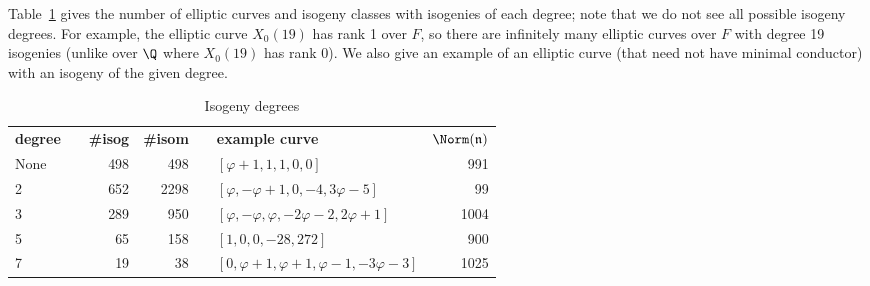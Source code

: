 \documentclass{amsart}
\newcommand{\n}{\mathfrak{n}}
\begin{document}
Table~\ref{table:degree} gives the number of elliptic curves and isogeny classes with
isogenies of each degree; note that we do not see all possible isogeny
degrees. For example, the elliptic curve $X_0(19)$ has rank 1 over $F$, so
there are infinitely many elliptic curves over $F$ with degree 19 isogenies
(unlike over $\Q$ where $X_0(19)$ has rank $0$).
We also give an example of an elliptic curve (that need not have minimal conductor)
with an isogeny of the given degree.
\begin{center}
\begin{table}[h]
\caption{Isogeny degrees\label{table:degree}}
\begin{tabular}{@{}lcrrclr@{}}\toprule
\textbf{degree} & \phantom{a} & \textbf{\#isog} & \textbf{\#isom} & \phantom{a} & \textbf{example curve} & $\Norm(\n)$ \\\cmidrule{1-1}\cmidrule{3-4}\cmidrule{6-7}
None & & 498 & 498  & & $[\varphi+1,1,1,0,0]$                               & 991  \\
2    & & 652 & 2298 & & $[\varphi,-\varphi+1,0,-4,3\varphi-5]$              & 99   \\
3    & & 289 & 950  & & $[\varphi,-\varphi,\varphi,-2\varphi-2,2\varphi+1]$ & 1004 \\
5    & & 65  & 158  & & $[1,0,0,-28,272]$                                   & 900  \\
7    & & 19  & 38   & & $[0,\varphi+1,\varphi+1,\varphi-1,-3\varphi-3]$     & 1025 \\\bottomrule
\end{tabular}
\end{table}
\end{center}
\end{document}
